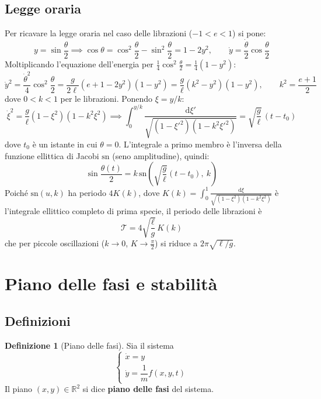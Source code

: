 \documentclass[11pt, a4paper, openright]{book}
\theoremstyle{plain}
\theoremstyle{definition}
\newtheorem{definizione}[teorema]{Definizione}
\theoremstyle{remark}
\begin{document}
\subsection{Legge oraria}
Per ricavare la legge oraria nel caso delle librazioni ($-1 < e < 1$) si pone:
\begin{equation}
    y = \sin\frac{\theta}{2} \implies \cos\theta = \cos^2\frac{\theta}{2} - \sin^2\frac{\theta}{2} = 1 - 2y^2, \qquad \dot{y} = \frac{\dot{\theta}}{2}\cos\frac{\theta}{2}
\end{equation}
Moltiplicando l'equazione dell'energia per $\frac{1}{4}\cos^2\frac{\theta}{2} = \frac{1}{4}(1 - y^2)$:
\begin{equation}
    \dot{y}^2 = \frac{\dot{\theta}^2}{4}\cos^2\frac{\theta}{2} = \frac{g}{2\ell}\left(e + 1 - 2y^2\right)(1 - y^2) = \frac{g}{\ell}\left(k^2 - y^2\right)(1 - y^2), \qquad k^2 = \frac{e + 1}{2}
\end{equation}
dove $0 < k < 1$ per le librazioni. Ponendo $\xi = y/k$:
\begin{equation}
    \dot{\xi}^2 = \frac{g}{\ell}(1 - \xi^2)(1 - k^2\xi^2) \implies \int_{0}^{y/k} \frac{\mathrm{d}\xi'}{\sqrt{(1 - \xi'^2)(1 - k^2\xi'^2)}} = \sqrt{\frac{g}{\ell}}\,(t - t_0)
\end{equation}
dove $t_0$ è un istante in cui $\theta = 0$. L'integrale a primo membro è l'inversa della funzione ellittica di Jacobi $\mathrm{sn}$ (seno amplitudine), quindi:
\begin{equation}
    \sin\frac{\theta(t)}{2} = k\,\mathrm{sn}\left(\sqrt{\frac{g}{\ell}}(t - t_0),\ k\right)
\end{equation}
Poiché $\mathrm{sn}(u, k)$ ha periodo $4K(k)$, dove $K(k) = \int_0^1 \frac{\mathrm{d}\xi}{\sqrt{(1-\xi^2)(1-k^2\xi^2)}}$ è l'integrale ellittico completo di prima specie, il periodo delle librazioni è
\begin{equation}
    \mathcal{T} = 4\sqrt{\frac{\ell}{g}}\,K(k)
\end{equation}
che per piccole oscillazioni ($k \to 0$, $K \to \frac{\pi}{2}$) si riduce a $2\pi\sqrt{\ell/g}$.

\section{Piano delle fasi e stabilità}

\subsection{Definizioni}
\begin{definizione}[Piano delle fasi]
    Sia il sistema
    \begin{equation}
        \begin{cases}
            \dot{x} = y \\
            \dot{y} = \dfrac{1}{m}f(x, y, t)
        \end{cases}
    \end{equation}
    Il piano $(x, y) \in \mathbb{R}^2$ si dice \textbf{piano delle fasi} del sistema.
\end{definizione}
\end{document}

